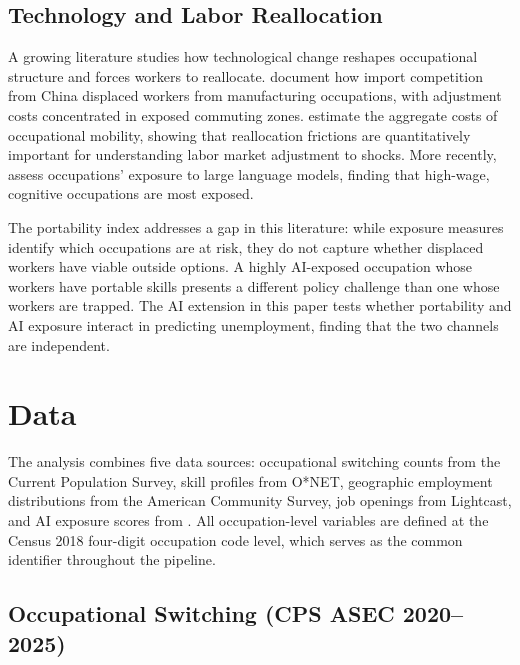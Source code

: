 \documentclass[12pt]{article}
\begin{document}
\subsection{Technology and Labor Reallocation}

A growing literature studies how technological change reshapes occupational structure and forces workers to reallocate. \citet{autor2013} document how import competition from China displaced workers from manufacturing occupations, with adjustment costs concentrated in exposed commuting zones. \citet{cortes2018} estimate the aggregate costs of occupational mobility, showing that reallocation frictions are quantitatively important for understanding labor market adjustment to shocks. More recently, \citet{eloundou2023} assess occupations' exposure to large language models, finding that high-wage, cognitive occupations are most exposed.

The portability index addresses a gap in this literature: while exposure measures identify which occupations are at risk, they do not capture whether displaced workers have viable outside options. A highly AI-exposed occupation whose workers have portable skills presents a different policy challenge than one whose workers are trapped. The AI extension in this paper tests whether portability and AI exposure interact in predicting unemployment, finding that the two channels are independent.

\section{Data}
\label{sec:data}

The analysis combines five data sources: occupational switching counts from the Current Population Survey, skill profiles from O*NET, geographic employment distributions from the American Community Survey, job openings from Lightcast, and AI exposure scores from \citet{eloundou2023}. All occupation-level variables are defined at the Census 2018 four-digit occupation code level, which serves as the common identifier throughout the pipeline.

\subsection{Occupational Switching (CPS ASEC 2020--2025)}
\label{sec:data_cps}
\end{document}
